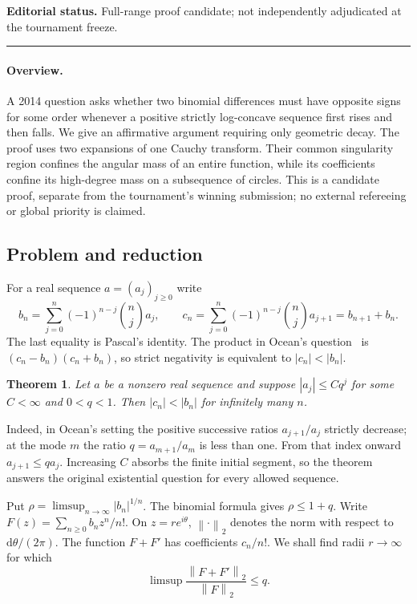 \documentclass[11pt,a4paper]{article}
\newtheorem{SourceRcaStheorem}{Theorem}
\begin{document}
\noindent\textbf{Editorial status.} Full-range proof candidate; not independently adjudicated at the tournament freeze. 

\smallskip\hrule\medskip



\begingroup
\newcommand{\norm}[1]{\left\|#1\right\|_2}
\newcommand{\dd}{\mathrm d}
\setcounter{equation}{0}
\renewcommand{\theequation}{\thesection.\arabic{equation}}
\renewcommand{\theHequation}{R20S.\arabic{equation}}
\paragraph{Overview.}
A 2014 question asks whether two binomial differences must have opposite signs for some order whenever a positive strictly log-concave sequence first rises and then falls. We give an affirmative argument requiring only geometric decay. The proof uses two expansions of one Cauchy transform. Their common singularity region confines the angular mass of an entire function, while its coefficients confine its high-degree mass on a subsequence of circles. This is a candidate proof, separate from the tournament's winning submission; no external refereeing or global priority is claimed.


\subsection{Problem and reduction}
For a real sequence $a=(a_j)_{j\ge0}$ write
\[
 b_n=\sum_{j=0}^n(-1)^{n-j}\binom nj a_j,\qquad
 c_n=\sum_{j=0}^n(-1)^{n-j}\binom nj a_{j+1}=b_{n+1}+b_n .
\]
The last equality is Pascal's identity. The product in Ocean's question~\cite{R20S:ocean} is $(c_n-b_n)(c_n+b_n)$, so strict negativity is equivalent to $|c_n|<|b_n|$.
\begin{SourceRcaStheorem}\label{R20S:main}
Let $a$ be a nonzero real sequence and suppose $|a_j|\le C q^j$ for some $C<\infty$ and $0<q<1$. Then $|c_n|<|b_n|$ for infinitely many $n$.
\end{SourceRcaStheorem}
Indeed, in Ocean's setting the positive successive ratios $a_{j+1}/a_j$ strictly decrease; at the mode $m$ the ratio $q=a_{m+1}/a_m$ is less than one. From that index onward $a_{j+1}\le q a_j$. Increasing $C$ absorbs the finite initial segment, so the theorem answers the original existential question for every allowed sequence.

Put $\rho=\limsup_{n\to\infty}|b_n|^{1/n}$. The binomial formula gives $\rho\le 1+q$. Write $F(z)=\sum_{n\ge0}b_nz^n/n!$. On $z=re^{i\theta}$, $\norm{\cdot}$ denotes the norm with respect to $\dd\theta/(2\pi)$. The function $F+F'$ has coefficients $c_n/n!$. We shall find radii $r\to\infty$ for which
\[
 \limsup\frac{\norm{F+F'}}{\norm{F}}\le q.
\]
\end{document}
